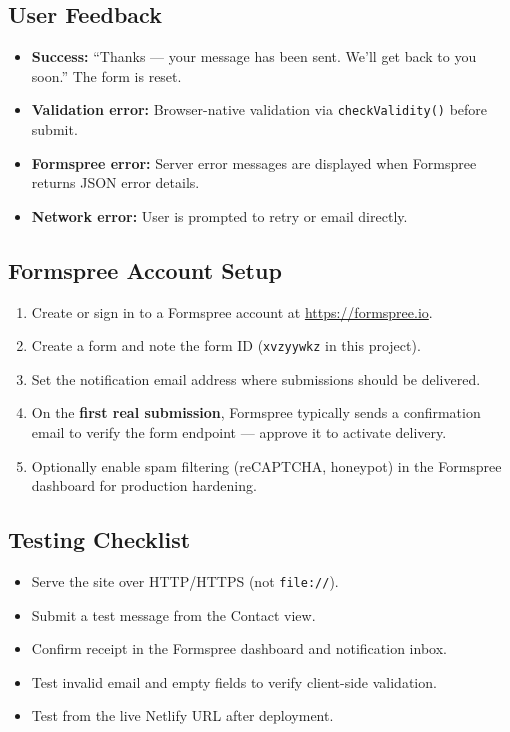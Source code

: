 \documentclass[11pt,a4paper]{article}
\begin{document}
\subsection{User Feedback}

\begin{itemize}[noitemsep]
  \item \textbf{Success:} ``Thanks --- your message has been sent. We'll get
        back to you soon.'' The form is reset.
  \item \textbf{Validation error:} Browser-native validation via
        \texttt{checkValidity()} before submit.
  \item \textbf{Formspree error:} Server error messages are displayed when
        Formspree returns JSON error details.
  \item \textbf{Network error:} User is prompted to retry or email directly.
\end{itemize}

\subsection{Formspree Account Setup}

\begin{enumerate}
  \item Create or sign in to a Formspree account at \url{https://formspree.io}.
  \item Create a form and note the form ID (\texttt{xvzyywkz} in this project).
  \item Set the notification email address where submissions should be delivered.
  \item On the \textbf{first real submission}, Formspree typically sends a
        confirmation email to verify the form endpoint --- approve it to activate
        delivery.
  \item Optionally enable spam filtering (reCAPTCHA, honeypot) in the Formspree
        dashboard for production hardening.
\end{enumerate}

\subsection{Testing Checklist}

\begin{itemize}
  \item Serve the site over HTTP/HTTPS (not \texttt{file://}).
  \item Submit a test message from the Contact view.
  \item Confirm receipt in the Formspree dashboard and notification inbox.
  \item Test invalid email and empty fields to verify client-side validation.
  \item Test from the live Netlify URL after deployment.
\end{itemize}
\end{document}
